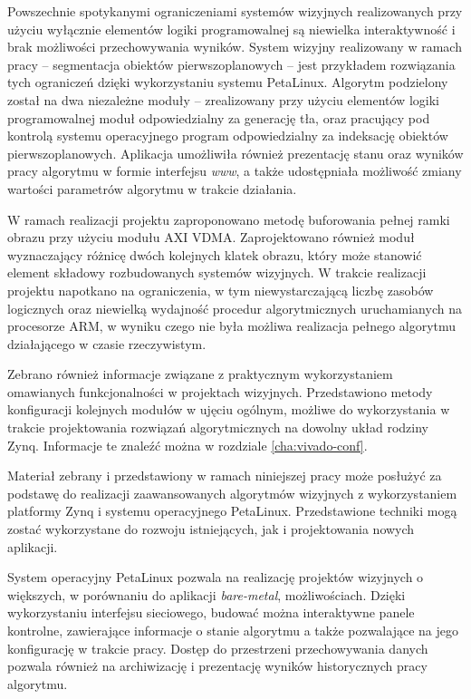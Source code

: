 Powszechnie spotykanymi ograniczeniami systemów wizyjnych realizowanych przy użyciu wyłącznie elementów logiki programowalnej są niewielka interaktywność i brak możliwości przechowywania wyników. System wizyjny realizowany w ramach pracy -- segmentacja obiektów pierwszoplanowych -- jest przykładem rozwiązania tych ograniczeń dzięki wykorzystaniu systemu PetaLinux. Algorytm podzielony został na dwa niezależne moduły -- zrealizowany przy użyciu elementów logiki programowalnej moduł odpowiedzialny za generację tła, oraz pracujący pod kontrolą systemu operacyjnego program odpowiedzialny za indeksację obiektów pierwszoplanowych. Aplikacja umożliwiła również prezentację stanu oraz wyników pracy algorytmu w formie interfejsu \emph{www}, a także udostępniała możliwość zmiany wartości parametrów algorytmu w trakcie działania.

W ramach realizacji projektu zaproponowano metodę buforowania pełnej ramki obrazu przy użyciu modułu AXI VDMA. 
Zaprojektowano również moduł wyznaczający różnicę dwóch kolejnych klatek obrazu, który może stanowić element składowy rozbudowanych systemów wizyjnych.
W trakcie realizacji projektu napotkano na ograniczenia, w tym niewystarczającą liczbę zasobów logicznych oraz niewielką wydajność procedur algorytmicznych uruchamianych na procesorze ARM, w wyniku czego nie była możliwa realizacja pełnego algorytmu działającego w czasie rzeczywistym.

Zebrano również informacje związane z praktycznym wykorzystaniem omawianych funkcjonalności w projektach wizyjnych. 
Przedstawiono metody konfiguracji kolejnych modułów w ujęciu ogólnym, możliwe do wykorzystania w trakcie projektowania rozwiązań algorytmicznych na dowolny układ rodziny Zynq. 
Informacje te znaleźć można w rozdziale \ref{cha:vivado-conf}.

Materiał zebrany i przedstawiony w ramach niniejszej pracy może posłużyć za podstawę do realizacji zaawansowanych algorytmów wizyjnych z wykorzystaniem platformy Zynq i systemu operacyjnego PetaLinux. 
Przedstawione techniki mogą zostać wykorzystane do rozwoju istniejących, jak i projektowania nowych aplikacji.

System operacyjny PetaLinux pozwala na realizację projektów wizyjnych o większych, w porównaniu do aplikacji \emph{bare-metal}, możliwościach. Dzięki wykorzystaniu interfejsu sieciowego, budować można interaktywne panele kontrolne, zawierające informacje o stanie algorytmu a także pozwalające na jego konfigurację w trakcie pracy. Dostęp do przestrzeni przechowywania danych pozwala również na archiwizację i prezentację wyników historycznych pracy algorytmu.

